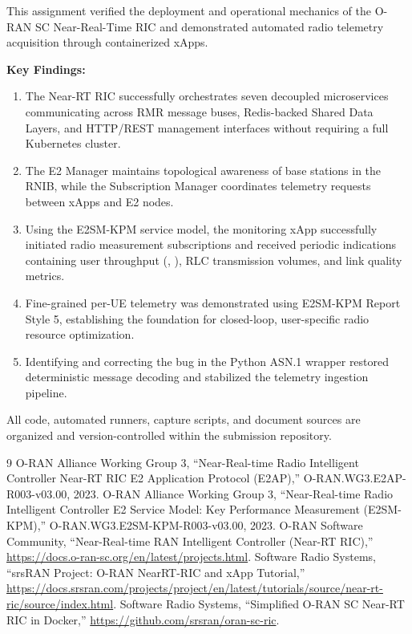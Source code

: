 \documentclass[11pt,a4paper]{article}
\newcommand{\code}[1]{\texttt{\small\detokenize{#1}}}
\begin{document}
This assignment verified the deployment and operational mechanics of the O-RAN SC Near-Real-Time RIC and demonstrated automated radio telemetry acquisition through containerized xApps.

\textbf{Key Findings:}
\begin{enumerate}\setlength{\itemsep}{0pt}\setlength{\parskip}{0pt}
  \item The Near-RT RIC successfully orchestrates seven decoupled microservices communicating across RMR message buses, Redis-backed Shared Data Layers, and HTTP/REST management interfaces without requiring a full Kubernetes cluster.
  \item The E2 Manager maintains topological awareness of base stations in the RNIB, while the Subscription Manager coordinates telemetry requests between xApps and E2 nodes.
  \item Using the E2SM-KPM service model, the monitoring xApp successfully initiated radio measurement subscriptions and received periodic indications containing user throughput (\code{DRB.UEThpDl}, \code{DRB.UEThpUl}), RLC transmission volumes, and link quality metrics.
  \item Fine-grained per-UE telemetry was demonstrated using E2SM-KPM Report Style 5, establishing the foundation for closed-loop, user-specific radio resource optimization.
  \item Identifying and correcting the \code{sys.getsizeof} bug in the Python ASN.1 wrapper restored deterministic message decoding and stabilized the telemetry ingestion pipeline.
\end{enumerate}

All code, automated runners, capture scripts, and document sources are organized and version-controlled within the submission repository.

\begingroup
\small
\begin{thebibliography}{9}\setlength{\itemsep}{0pt}
   O-RAN Alliance Working Group 3, ``Near-Real-time Radio Intelligent Controller Near-RT RIC E2 Application Protocol (E2AP),'' O-RAN.WG3.E2AP-R003-v03.00, 2023.
   O-RAN Alliance Working Group 3, ``Near-Real-time Radio Intelligent Controller E2 Service Model: Key Performance Measurement (E2SM-KPM),'' O-RAN.WG3.E2SM-KPM-R003-v03.00, 2023.
   O-RAN Software Community, ``Near-Real-time RAN Intelligent Controller (Near-RT RIC),'' \url{https://docs.o-ran-sc.org/en/latest/projects.html}.
   Software Radio Systems, ``srsRAN Project: O-RAN NearRT-RIC and xApp Tutorial,'' \url{https://docs.srsran.com/projects/project/en/latest/tutorials/source/near-rt-ric/source/index.html}.
   Software Radio Systems, ``Simplified O-RAN SC Near-RT RIC in Docker,'' \url{https://github.com/srsran/oran-sc-ric}.
\end{thebibliography}
\endgroup
\end{document}
